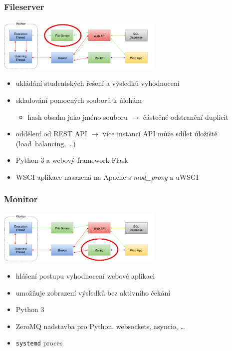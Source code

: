 \documentclass{beamer}
\begin{document}
\begin{frame}
	\frametitle{Fileserver}
	\begin{center}
		\includegraphics[width=0.6\textwidth]{images/communication-fileserver.png}
	\end{center}
	\begin{itemize}
		\item ukládání studentských řešení a výsledků vyhodnocení
		\item skladování pomocných souborů k úlohám
			\begin{itemize}
				\item hash obsahu jako jméno souboru $\rightarrow$ částečné odstranění duplicit
			\end{itemize}
		\item oddělení od REST API $\rightarrow$ více instancí API může sdílet úložiště (load~balancing, \dots)
		\item Python 3 a webový framework Flask
		\item WSGI aplikace nasazená na Apache s {\it mod\_proxy} a uWSGI
	\end{itemize}
\end{frame}

\begin{frame}
	\frametitle{Monitor}
	\begin{center}
		\includegraphics[width=0.6\textwidth]{images/communication-monitor.png}
	\end{center}
	\begin{itemize}
		\item hlášení postupu vyhodnocení webové aplikaci
		\item umožňuje zobrazení výsledků bez aktivního čekání
		\item Python 3
		\item ZeroMQ nadstavba pro Python, websockets, asyncio, \dots
		\item \texttt{systemd} proces
	\end{itemize}
\end{frame}
\end{document}
